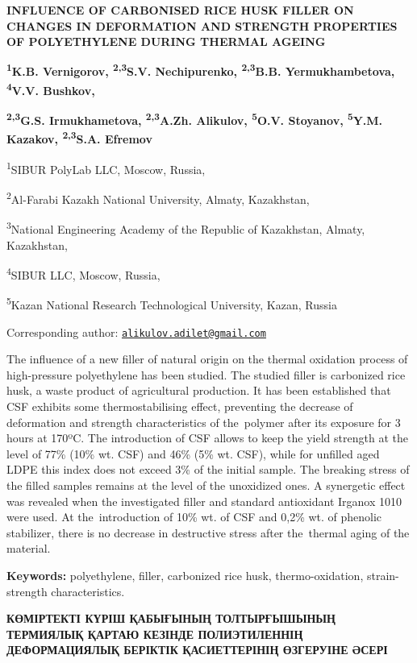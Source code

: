 
{\bfseries INFLUENCE OF CARBONISED RICE HUSK FILLER ON CHANGES IN
DEFORMATION AND STRENGTH PROPERTIES OF POLYETHYLENE DURING THERMAL
AGEING}

{\bfseries \textsuperscript{1}K.B. Vernigorov, \textsuperscript{2,3}S.V.
Nechipurenko, \textsuperscript{2,3}B.B. Yermukhambetova,
\textsuperscript{4}V.V. Bushkov,}

{\bfseries \textsuperscript{2,3}G.S. Irmukhametova,
\textsuperscript{2,3}A.Zh. Alikulov\textsuperscript{\envelope },
\textsuperscript{5}O.V. Stoyanov, \textsuperscript{5}Y.M. Kazakov,
\textsuperscript{2,3}S.A. Efremov}

\textsuperscript{1}SIBUR PolyLab LLC, Moscow, Russia,

\textsuperscript{2}Al-Farabi Kazakh National University, Almaty,
Kazakhstan,

\textsuperscript{3}National Engineering Academy of the Republic of
Kazakhstan, Almaty, Kazakhstan,

\textsuperscript{4}SIBUR LLC, Moscow, Russia,

\textsuperscript{5}Kazan National Research Technological University,
Kazan, Russia

Corresponding author:
\href{mailto:alikulov.adilet@gmail.com}{\nolinkurl{alikulov.adilet@gmail.com}}

The influence of a new filler of natural origin on the thermal oxidation
process of high-pressure polyethylene has been studied. The studied
filler is carbonized rice husk, a waste product of agricultural
production. It has been established that CSF exhibits some
thermostabilising effect, preventing the decrease of deformation and
strength characteristics of the~polymer after its exposure for 3 hours
at 170ºC. The introduction of CSF allows to keep the yield strength at
the level of 77\% (10\% wt. CSF) and 46\% (5\% wt. CSF), while for
unfilled aged LDPE this index does not exceed 3\% of the initial sample.
The breaking stress of the filled samples remains at the level of the
unoxidized ones. A synergetic effect was revealed when the investigated
filler and standard antioxidant Irganox 1010 were used. At
the~introduction of 10\% wt. of CSF and 0,2\% wt. of phenolic
stabilizer, there is no decrease in destructive stress after the~thermal
aging of the material.

{\bfseries Keywords:} polyethylene, filler, carbonized rice husk,
thermo-oxidation, strain-strength characteristics.

{\bfseries КӨМІРТЕКТІ КҮРІШ ҚАБЫҒЫНЫҢ ТОЛТЫРҒЫШЫНЫҢ ТЕРМИЯЛЫҚ ҚАРТАЮ
КЕЗІНДЕ ПОЛИЭТИЛЕННІҢ ДЕФОРМАЦИЯЛЫҚ БЕРІКТІК ҚАСИЕТТЕРІНІҢ ӨЗГЕРУІНЕ
ӘСЕРІ}

